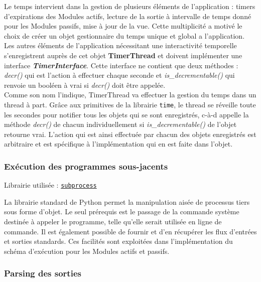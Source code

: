 \documentclass[]{article}
\begin{document}
\par Le temps intervient dans la gestion de plusieurs éléments de l'application : timers d'expirations des Modules actifs, lecture de la sortie à intervalle de temps donné pour les Modules passifs, mise à jour de la vue. Cette multiplicité a motivé le choix de créer un objet gestionnaire du temps unique et global a l'application. Les autres éléments de l'application nécessitant une interactivité temporelle s'enregistrent auprès de cet objet \textbf{TimerThread} et doivent implémenter une interface \textbf{\textit{TimerInterface}}. Cette interface ne contient que deux méthodes : \textit{decr()} qui est l'action à effectuer chaque seconde et \textit{is\_decrementable()} qui renvoie un booléen à vrai si \textit{decr()} doit être appelée.\\

Comme son nom l'indique, TimerThread va effectuer la gestion du temps dans un thread à part. Grâce aux primitives de la librairie \texttt{time}, le thread se réveille toute les secondes pour notifier tous les objets qui se sont enregistrés, c-à-d appelle la méthode \textit{decr()} de chacun individuellement si \textit{is\_decrementable()} de l'objet retourne vrai. L'action qui est ainsi effectuée par chacun des objets enregistrés est arbitraire et est spécifique à l'implémentation qui en est faite dans l'objet.

\subsubsection{Exécution des programmes sous-jacents}

\noindent Librairie utilisée : \href{https://docs.python.org/fr/3/library/subprocess.html}{\texttt{subprocess}}\\

\par La librairie standard de Python permet la manipulation aisée de processus tiers sous forme d'objet. Le seul prérequis est le passage de la commande système destinée à appeler le programme, telle qu'elle serait utilisée en ligne de commande. Il est également possible de fournir et d'en récupérer les flux d'entrées et sorties standards. Ces facilités sont exploitées dans l'implémentation du schéma d'exécution pour les Modules actifs et passifs. 

\subsubsection{Parsing des sorties}
\end{document}
